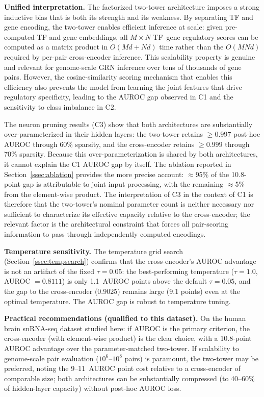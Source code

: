 \documentclass[journal]{IEEEtran}
\begin{document}
\textbf{Unified interpretation.} The factorized two-tower architecture imposes
a strong inductive bias that is both its strength and its weakness. By
separating TF and gene encoding, the two-tower enables efficient inference at
scale: given pre-computed TF and gene embeddings, all $M \times N$ TF--gene
regulatory scores can be computed as a matrix product in $O(Md + Nd)$ time
rather than the $O(MNd)$ required by per-pair cross-encoder inference. This
scalability property is genuine and relevant for genome-scale GRN inference
over tens of thousands of gene pairs. However, the cosine-similarity scoring
mechanism that enables this efficiency also prevents the model from learning
the joint features that drive regulatory specificity, leading to the AUROC gap
observed in C1 and the sensitivity to class imbalance in C2.

The neuron pruning results (C3) show that both architectures are substantially
over-parameterized in their hidden layers: the two-tower retains $\geq 0.997$
post-hoc AUROC through 60\% sparsity, and the cross-encoder retains $\geq 0.999$
through 70\% sparsity. Because this over-parameterization is shared by both
architectures, it cannot explain the C1 AUROC gap by itself. The ablation
reported in Section~\ref{ssec:ablation} provides the more precise account:
$\approx$95\% of the 10.8-point gap is attributable to joint input processing,
with the remaining $\approx$5\% from the element-wise product. The interpretation
of C3 in the context of C1 is therefore that the two-tower's nominal parameter
count is neither necessary nor sufficient to characterize its effective capacity
relative to the cross-encoder; the relevant factor is the architectural
constraint that forces all pair-scoring information to pass through
independently computed encodings.

\textbf{Temperature sensitivity.} The temperature grid search
(Section~\ref{ssec:tempsearch}) confirms that the cross-encoder's AUROC advantage is
not an artifact of the fixed $\tau = 0.05$: the best-performing temperature ($\tau = 1.0$,
AUROC $= 0.8111$) is only 1.1~AUROC points above the default $\tau = 0.05$, and
the gap to the cross-encoder (0.9025) remains large (9.1 points) even at the
optimal temperature. The AUROC gap is robust to temperature tuning.

\textbf{Practical recommendations (qualified to this dataset).}
On the human brain snRNA-seq dataset studied here: if AUROC is the primary
criterion, the cross-encoder (with element-wise product) is the clear choice,
with a 10.8-point AUROC advantage over the parameter-matched two-tower. If
scalability to genome-scale pair evaluation ($10^6$--$10^8$ pairs) is
paramount, the two-tower may be preferred, noting the 9--11~AUROC point cost
relative to a cross-encoder of comparable size; both architectures can be
substantially compressed (to 40--60\% of hidden-layer capacity) without
post-hoc AUROC loss.
\end{document}
